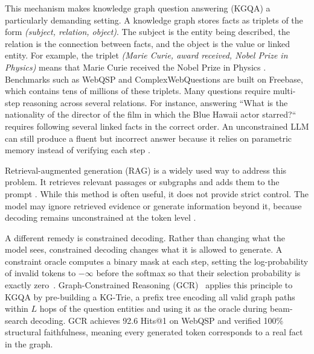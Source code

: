 This mechanism makes knowledge graph question answering (KGQA) a particularly demanding setting. A knowledge graph stores facts as triplets of the form \emph{(subject, relation, object)}. The subject is the entity being described, the relation is the connection between facts, and the object is the value or linked entity. For example, the triplet \emph{(Marie Curie, award received, Nobel Prize in Physics)} means that Marie Curie received the Nobel Prize in Physics \citep{bollacker2008freebase}. Benchmarks such as WebQSP \citep{yih2016websqp} and ComplexWebQuestions \citep{talmor2018cwq} are built on Freebase, which contains tens of millions of these triplets. Many questions require multi-step reasoning across several relations. For instance, answering ``What is the nationality of the director of the film in which the Blue Hawaii actor starred?`` requires following several linked facts in the correct order. An unconstrained LLM can still produce a fluent but incorrect answer because it relies on parametric memory instead of verifying each step \citep{lan2022survey,he2021improving}.

Retrieval-augmented generation (RAG) is a widely used way to address this problem. It retrieves relevant passages or subgraphs and adds them to the prompt \citep{lewis2020rag,izacard2021leveraging}. While this method is often useful, it does not provide strict control. The model may ignore retrieved evidence or generate information beyond it, because decoding remains unconstrained at the token level \citep{asai2024selfrag,agrawal2024mindfulrag}.

A different remedy is constrained decoding. Rather than changing what the model sees, constrained decoding changes what it is allowed to generate. A constraint oracle computes a binary mask at each step, setting the log-probability of invalid tokens to $-\infty$ before the softmax so that their selection probability is exactly zero~\citep{geng2023grammarconstrained,willard2023outlines}. Graph-Constrained Reasoning (GCR)~\citep{luo2025-graph-constrained-reasoning} applies this principle to KGQA by pre-building a KG-Trie, a prefix tree encoding all valid graph paths within $L$ hops of the question entities and using it as the oracle during beam-search decoding. GCR achieves 92.6 Hits@1 on WebQSP and verified 100\% structural faithfulness, meaning every generated token corresponds to a real fact in the graph.

